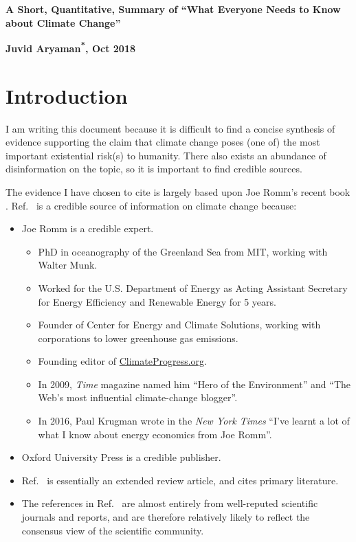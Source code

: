 \documentclass[11pt]{article}
\begin{document}
\newcommand{\cotwo}{CO\textsubscript{2}}
\newcommand{\meth}{CH\textsubscript{4}}

\begin{flushleft}
\textsf{\textbf{\large{A Short, Quantitative, Summary of ``What Everyone Needs to Know about Climate Change''}}}
\end{flushleft}

\begin{flushleft}
\textsf{\textbf{Juvid Aryaman\textsuperscript{*}, Oct 2018}}
\end{flushleft}

\section{Introduction}



I am writing this document because it is difficult to find a concise synthesis of evidence supporting the claim that climate change poses (one of) the most important existential risk(s) to humanity. There also exists an abundance of disinformation on the topic, so it is important to find credible sources.

The evidence I have chosen to cite is largely based upon Joe Romm's recent book \cite{Romm18}. Ref.~\cite{Romm18} is a credible source of information on climate change because:
\begin{itemize}
\item Joe Romm is a credible expert.
\begin{itemize}
\item PhD in oceanography of the Greenland Sea from MIT, working with Walter Munk.
\item Worked for the U.S. Department of Energy as Acting Assistant Secretary for Energy Efficiency and Renewable Energy for 5 years.
\item Founder of Center for Energy and Climate Solutions, working with corporations to lower greenhouse gas emissions.
\item Founding editor of \url{ClimateProgress.org}.
\item In 2009, \textit{Time} magazine named him ``Hero of the Environment'' and ``The Web's most influential climate-change blogger''.
\item In 2016, Paul Krugman wrote in the \textit{New York Times} ``I've learnt a lot of what I know about energy economics from Joe Romm''.
\end{itemize}
\item Oxford University Press is a credible publisher.
\item Ref.~\cite{Romm18} is essentially an extended review article, and cites primary literature.
\item The references in Ref.~\cite{Romm18} are almost entirely from well-reputed scientific journals and reports, and are therefore relatively likely to reflect the consensus view of the scientific community.
\end{itemize}
\end{document}

